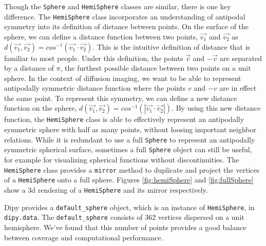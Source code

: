 Though the \texttt{Sphere} and \texttt{HemiSphere} classes are similar, there is one key difference. The \texttt{HemiSphere} class incorporates an understanding of antipodal symmetry into its definition of distance between points. On the surface of the sphere, we can define a distance function between two points, $\vec{v_1}$ and $\vec{v_2}$ as $d(\vec{v_1}, \vec{v_2}) = cos^{-1}(\vec{v_1} \cdot \vec{v_2})$. This is the intuitive definition of distance that is familiar to most people. Under this definition, the points $\vec{v}$ and $-\vec{v}$ are separated by a distance of $\pi$, the furthest possible distance between two points on a unit sphere. In the context of diffusion imaging, we want to be able to represent antipodally symmetric distance function where the points $v$ and $-v$ are in effect the same point. To represent this symmetry, we can define a new distance function on the sphere, $d(\vec{v_1}, \vec{v_2}) = cos^{-1}(|\vec{v_1} \cdot \vec{v_2}|)$. By using this new distance function, the \texttt{HemiSphere} class is able to effectively represent an antipodally symmetric sphere with half as many points, without loosing important neighbor relations. While it is redundant to use a full \texttt{Sphere} to represent an antipodally symmetric spherical surface, sometimes a full \texttt{Sphere} object can still be useful, for example for visualizing spherical functions without discontinuities. The \texttt{HemiSphere} class provides a \texttt{mirror} method to duplicate and project the vertices of a \texttt{HemiSphere} onto a full sphere. Figures \ref{fig:hemiSphere} and \ref{fig:fullSphere} show a 3d rendering of a \texttt{HemiSphere} and its mirror respectively.

Dipy provides a \texttt{default_sphere} object, which is an instance of \texttt{HemiSphere}, in \texttt{dipy.data}. The \texttt{default_sphere} consists of 362 vertices dispersed on a unit hemisphere. We've found that this number of points provides a good balance between coverage and computational performance.
